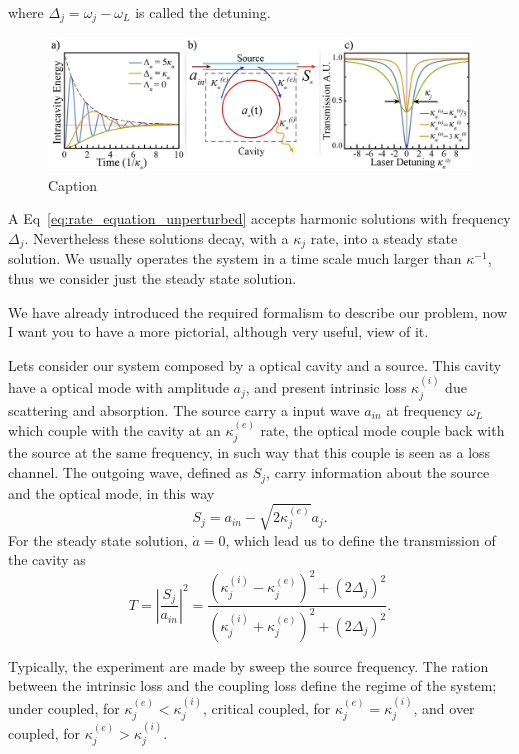 where $\Delta_j = \omega_j - \omega_L$ is called the detuning.
\begin{figure}[t!]
    \centering
    \includegraphics[width = 16cm]{Dissertation_rate_equation.jpg}
    \caption{Caption}
    \label{fig:rate_equations_single_mode}
\end{figure}
A Eq~\ref{eq:rate_equation_unperturbed} accepts harmonic solutions with frequency $\Delta_j$. Nevertheless these solutions decay, with a  $\kappa_j$ rate, into a steady state solution. We usually operates the system in a time scale much larger than $\kappa^{-1}$, thus we consider just the steady state solution. 

We have already introduced the required formalism to describe our problem, now I want you to have a more pictorial, although very useful, view of it. 

Lets consider our system composed by a optical cavity and a source. This cavity have a optical mode with amplitude $a_j$, and present intrinsic loss $\kappa_j^{(i)}$ due scattering and absorption. The source carry a input wave $a_{in}$ at frequency $\omega_L$ which couple with the cavity at an $\kappa_j^{(e)}$ rate, the optical mode couple back with the source at the same frequency, in such way that this couple is seen as a loss channel. The outgoing wave, defined as $S_j$, carry information about the source and the optical mode, in this way
\begin{equation}
    S_j = a_{in} - \sqrt{2 \kappa_j^{(e)}}a_j.
\end{equation}
For the steady state solution, $\dot{a} = 0$, which lead us to define the transmission of the cavity as
\begin{equation}
    T = \left|\frac{S_j}{a_{in}}\right|^2 = \frac{\left(\kappa_j^{(i)} -\kappa_j^{(e)}\right)^2 + (2\Delta_j)^2}{\left(\kappa_j^{(i)} +\kappa_j^{(e)}\right)^2 + (2\Delta_j)^2}.
    \label{eq:single_mode_transmission}
\end{equation}

Typically, the experiment are made by sweep the source frequency. The ration between the intrinsic loss and the coupling loss define the regime of the system; under coupled, for $\kappa_j^{(e)} < \kappa_j^{(i)}$, critical coupled, for $\kappa_j^{(e)} = \kappa_j^{(i)}$, and over coupled, for $\kappa_j^{(e)} > \kappa_j^{(i)}$. 

